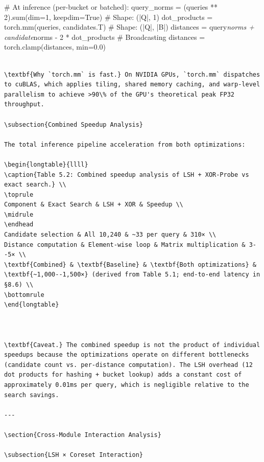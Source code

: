 \documentclass[12pt,a4paper,oneside]{report}
\begin{document}
# At inference (per-bucket or batched):
query_norms = (queries ** 2).sum(dim=1, keepdim=True)    # Shape: (|Q|, 1)
dot_products = torch.mm(queries, candidates.T)            # Shape: (|Q|, |B|)
distances = query\textit{norms + candidate}norms - 2 * dot_products  # Broadcasting
distances = torch.clamp(distances, min=0.0)
\begin{verbatim}

\textbf{Why `torch.mm` is fast.} On NVIDIA GPUs, `torch.mm` dispatches to cuBLAS, which applies tiling, shared memory caching, and warp-level parallelism to achieve >90\% of the GPU's theoretical peak FP32 throughput.

\subsection{Combined Speedup Analysis}

The total inference pipeline acceleration from both optimizations:

\begin{longtable}{llll}
\caption{Table 5.2: Combined speedup analysis of LSH + XOR-Probe vs exact search.} \\
\toprule
Component & Exact Search & LSH + XOR & Speedup \\
\midrule
\endhead
Candidate selection & All 10,240 & ~33 per query & 310× \\
Distance computation & Element-wise loop & Matrix multiplication & 3--5× \\
\textbf{Combined} & \textbf{Baseline} & \textbf{Both optimizations} & \textbf{~1,000--1,500×} (derived from Table 5.1; end-to-end latency in §8.6) \\
\bottomrule
\end{longtable}



\textbf{Caveat.} The combined speedup is not the product of individual speedups because the optimizations operate on different bottlenecks (candidate count vs. per-distance computation). The LSH overhead (12 dot products for hashing + bucket lookup) adds a constant cost of approximately 0.01ms per query, which is negligible relative to the search savings.

---

\section{Cross-Module Interaction Analysis}

\subsection{LSH × Coreset Interaction}


\end{verbatim}
\end{document}
